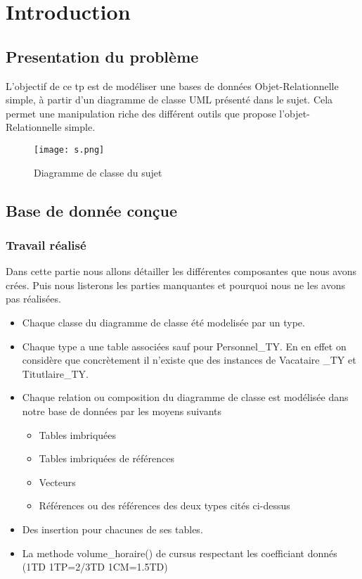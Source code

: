 \chapter{Introduction}
\section{Presentation du problème}
L'objectif de ce tp est de modéliser une bases de données Objet-Relationnelle simple, à partir d'un diagramme de classe UML présenté dans le sujet. Cela permet une manipulation riche des différent outils que propose l'objet-Relationnelle simple.
\newline
\begin{figure}[!h] 
\centering
  \texttt{[image: s.png]}
  \caption{Diagramme de classe du sujet}
\end{figure} 

\clearpage
\section{Base de donnée conçue}
\subsection{Travail réalisé}
Dans cette partie nous allons détailler les différentes composantes que nous avons crées. Puis nous listerons les parties manquantes et pourquoi nous ne les avons pas réalisées.\renewcommand{\labelitemi}{$\bullet$}
\begin{itemize}
\item
Chaque classe du diagramme de classe été modelisée par un type.
\item
Chaque type a une table associées sauf pour Personnel\_TY. En en effet on considère que concrètement il n'existe que des instances de Vacataire \_TY et Titutlaire\_TY.
\item
Chaque relation ou composition du diagramme de classe est modélisée dans notre base de données par les moyens suivants 
\begin{itemize}
\item
Tables imbriquées
\item
Tables imbriquées de références
\item
Vecteurs
\item
Références ou des références des deux types cités ci-dessus
\end{itemize}
\item
Des insertion pour chacunes de ses tables.
\item
La methode volume\_horaire() de cursus respectant les coefficiant donnés  (1TD 1TP=2/3TD 1CM=1.5TD)
\end{itemize}

